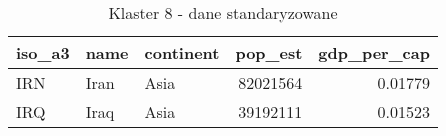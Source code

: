 \begin{table}[h!]
    \centering
    \caption{Klaster 8 - dane standaryzowane}
    \label{tab:cl8std}
    \begin{tabular}{lllrr}
        \toprule
        iso\_a3 & name & continent & pop\_est & gdp\_per\_cap \\
        \midrule
        IRN     & Iran & Asia      & 82021564 & 0.01779       \\
        IRQ     & Iraq & Asia      & 39192111 & 0.01523       \\
        \bottomrule
    \end{tabular}
\end{table}
